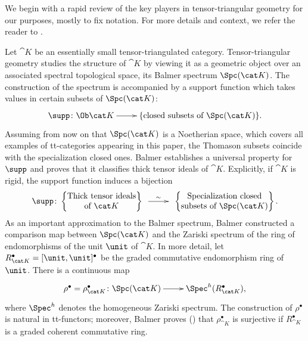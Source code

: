 \documentclass{amsart}%
\numberwithin{equation}{section}%
\theoremstyle{remark}
\begin{document}
We begin with a rapid review of the key players in tensor-triangular geometry for our purposes, mostly to fix notation. For more details and context, we refer the reader to \cite{Balmer05a}.

Let $\cat K$ be an essentially small tensor-triangulated category. Tensor-triangular geometry studies the structure of $\cat K$ by viewing it as a geometric object over an associated spectral topological space, its Balmer spectrum $\Spc(\cat K)$.
The construction of the spectrum is accompanied by a support function which takes values in certain subsets of $\Spc(\cat K)$:
\begin{equation}\label{eq:Balmersupport}
    \xymatrix{\supp\colon \Ob\cat K \ar[r] & \{\text{closed subsets of } \Spc(\cat K)\}.}
\end{equation}
Assuming from now on that $\Spc(\cat K)$ is a Noetherian space, which covers all examples of tt-categories appearing in this paper, the Thomason subsets coincide with the specialization closed ones. Balmer establishes a universal property for $\supp$ and proves that it classifies thick tensor ideals of $\cat K$. Explicitly, if $\cat K$ is rigid, the support function induces a bijection
\[
\supp\colon\begin{Bmatrix}
\text{Thick tensor ideals} \\
\text{of } \cat K
\end{Bmatrix} 
\xymatrix@C=2pc{ \ar[r]^-{\sim} &}
\begin{Bmatrix}
\text{Specialization closed} \\
\text{subsets of } \Spc(\cat K)
\end{Bmatrix}.
\]
As an important approximation to the Balmer spectrum, Balmer \cite{Balmer10b} constructed a comparison map between $\Spc(\cat K)$ and the Zariski spectrum of the ring of endomorphisms of the unit $\unit$ of $\cat K$. In more detail, let $R_{\cat K}^{\bullet} = [\unit,\unit]^{\bullet}$ be the graded commutative endomorphism ring of $\unit$. There is a continuous map
\begin{equation}\label{eq:Balmercomparisonmap}
    \xymatrix{\rho^{\bullet} = \rho_{\cat K}^{\bullet}\colon \Spc(\cat K) \ar[r] & \Spec^h(R_{\cat K}^{\bullet}),}
\end{equation}
where $\Spec^h$ denotes the homogeneous Zariski spectrum. The construction of $\rho^{\bullet}$ is natural in tt-functors; moreover, Balmer proves (\cite[Thm.~7.3]{Balmer10b}) that $\rho_{\cat K}^{\bullet}$ is surjective if $R_{\cat K}^{\bullet}$ is a graded coherent commutative ring.
\end{document}
